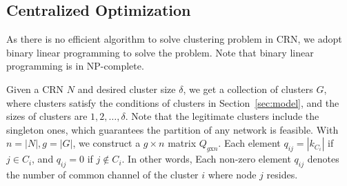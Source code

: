 \subsection{Centralized Optimization}

As there is no efficient algorithm to solve clustering problem in CRN, we adopt binary linear programming to solve the problem.
Note that binary linear programming is in NP-complete.







Given a CRN $N$ and desired cluster size $\delta$, we get a collection of clusters $G$, where clusters satisfy the conditions of clusters in Section~\ref{sec:model}, and the sizes of clusters are $1,2,\ldots,\delta$.
Note that the legitimate clusters include the singleton ones, which guarantees the partition of any network is feasible.
With $n=|N|,g=|G|$, we construct a $g\times n$ matrix $Q_{g\text{x}n}$. 
Each element $q_{ij}= |k_{C_i}|$ if $j\in C_i$, and $q_{ij}= 0$ if $j\notin C_i$.
In other words, Each non-zero element $q_{ij}$ denotes the number of common channel of the cluster $i$ where node $j$ resides.

